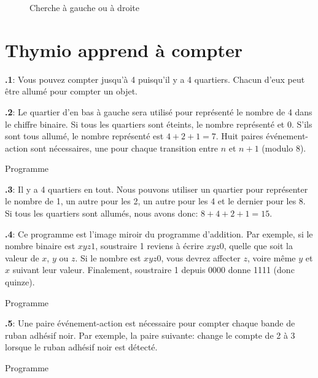 \documentclass[12pt,a4paper,french]{article}
\begin{document}
\begin{figure}
\begin{center}
\caption{Cherche à gauche ou à droite}\label{fig.follow1}
\end{center}
\end{figure}

\section{Thymio apprend à compter}

\textbf{\thesection.1}:
Vous pouvez compter jusqu'à 4 puisqu'il y a 4 quartiers. Chacun d'eux peut être allumé pour compter un objet.

\textbf{\thesection.2}:
Le quartier d'en bas à gauche sera utilisé pour représenté le nombre de 4 dans le chiffre binaire. Si tous les quartiers sont éteints, le nombre représenté et 0. S'ils sont tous allumé, le nombre représenté est $4+2+1=7$. Huit paires événement-action sont nécessaires, une pour chaque transition entre $n$ et $n+1$ (modulo 8).

{\raggedleft \hfill Programme }

\textbf{\thesection.3}:
Il y a 4 quartiers en tout. Nous pouvons utiliser un quartier pour représenter le nombre de 1, un autre pour les 2, un autre pour les 4 et le dernier pour les 8. Si tous les quartiers sont allumés, nous avons donc: $8+4+2+1 = 15$.


\textbf{\thesection.4}:
Ce programme est l'image miroir du programme d'addition. Par exemple, si le nombre binaire est $xyz1$, soustraire 1 reviens à écrire $xyz0$, quelle que soit la valeur de $x$, $y$ ou $z$. Si le nombre est $xyz0$, vous devrez affecter $z$, voire même $y$ et $x$ suivant leur valeur. Finalement, soustraire 1 depuis 0000 donne 1111 (donc quinze).

{\raggedleft \hfill Programme }

\textbf{\thesection.5}:
Une paire événement-action est nécessaire pour compter chaque bande de ruban adhésif noir. Par exemple, la paire suivante:  change le compte de 2 à 3 lorsque le ruban adhésif noir est détecté.

{\raggedleft \hfill Programme }
\end{document}
